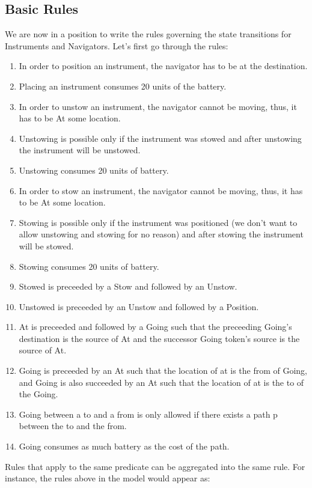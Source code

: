 \documentclass[10pt, letterpaper, twoside]{article}
\begin{document}
\subsection{Basic Rules}
\label{rules}

We are now in a position to write the rules governing the state transitions
for Instruments and Navigators.  Let's first go through the rules:
\begin{enumerate}
 \item In order to position an instrument, the navigator has to be at the
destination. 
 \item Placing an instrument consumes 20 units of the battery.
 \item In order to unstow an instrument, the navigator cannot be moving,
thus, it has to be At some location.
 \item Unstowing is possible only if the instrument was stowed and after
unstowing the instrument will be unstowed.
 \item Unstowing consumes 20 units of battery.
 \item In order to stow an instrument, the navigator cannot be moving,
thus, it has to be At some location.
 \item Stowing is possible only if the instrument was positioned (we don't
want to allow unstowing and stowing for no reason) and after stowing the
instrument will be stowed.
 \item Stowing consumes 20 units of battery.
 \item Stowed is preceeded by a Stow and followed by an Unstow.
 \item Unstowed is preceeded by an Unstow and followed by a Position.
 \item At is preceeded and followed by a Going such that the preceeding
Going's destination is the source of At and the successor Going token's
source is the source of At.
 \item Going is preceeded by an At such that the location of at is the from
of Going, and Going is also succeeded by an At such that the location of at
is the to of the Going.
 \item Going between a to and a from is only allowed if there exists a path
p between the to and the from.
 \item Going consumes as much battery as the cost of the path.
\end{enumerate}
Rules that apply to the same predicate can be aggregated into the same
rule.  For instance, the rules above in the model would appear as:
\end{document}
